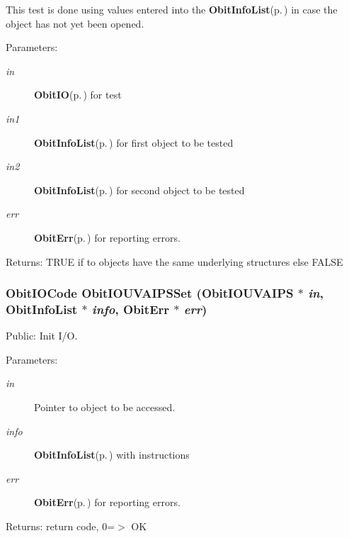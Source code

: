 This test is done using values entered into the {\bf Obit\-Info\-List}{\rm (p.\,\pageref{structObitInfoList})} in case the object has not yet been opened. \begin{Desc}
\item[Parameters:]
\begin{description}
\item[{\em in}]{\bf Obit\-IO}{\rm (p.\,\pageref{structObitIO})} for test \item[{\em in1}]{\bf Obit\-Info\-List}{\rm (p.\,\pageref{structObitInfoList})} for first object to be tested \item[{\em in2}]{\bf Obit\-Info\-List}{\rm (p.\,\pageref{structObitInfoList})} for second object to be tested \item[{\em err}]{\bf Obit\-Err}{\rm (p.\,\pageref{structObitErr})} for reporting errors. \end{description}
\end{Desc}
\begin{Desc}
\item[Returns:]TRUE if to objects have the same underlying structures else FALSE \end{Desc}
\subsubsection{\setlength{\rightskip}{0pt plus 5cm}Obit\-IOCode Obit\-IOUVAIPSSet ({\bf Obit\-IOUVAIPS} $\ast$ {\em in}, {\bf Obit\-Info\-List} $\ast$ {\em info}, {\bf Obit\-Err} $\ast$ {\em err})}\label{ObitIOUVAIPS_8h_a12}


Public: Init I/O. 

\begin{Desc}
\item[Parameters:]
\begin{description}
\item[{\em in}]Pointer to object to be accessed. \item[{\em info}]{\bf Obit\-Info\-List}{\rm (p.\,\pageref{structObitInfoList})} with instructions \item[{\em err}]{\bf Obit\-Err}{\rm (p.\,\pageref{structObitErr})} for reporting errors. \end{description}
\end{Desc}
\begin{Desc}
\item[Returns:]return code, 0=$>$ OK \end{Desc}
